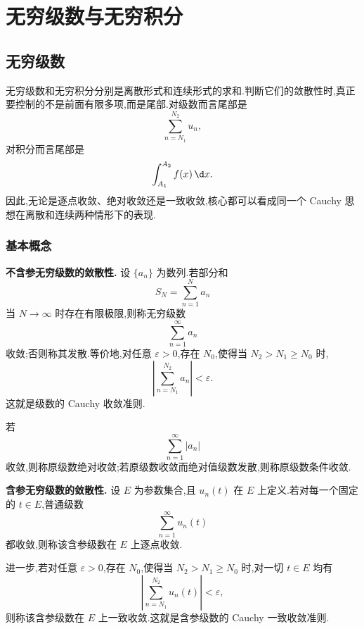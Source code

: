 \section{无穷级数与无穷积分}


\subsection{无穷级数}

无穷级数和无穷积分分别是离散形式和连续形式的求和.判断它们的敛散性时,真正要控制的不是前面有限多项,而是尾部.对级数而言尾部是
\begin{equation*}
	\sum_{n=N_1}^{N_2}u_n,
\end{equation*}
对积分而言尾部是
\begin{equation*}
	\int_{A_1}^{A_2}f(x)\,\d x.
\end{equation*}
因此,无论是逐点收敛、绝对收敛还是一致收敛,核心都可以看成同一个 Cauchy 思想在离散和连续两种情形下的表现.

\subsubsection{基本概念}

\textbf{不含参无穷级数的敛散性.}
设 $\{a_n\}$ 为数列.若部分和
\begin{equation*}
	S_N=\sum_{n=1}^N a_n
\end{equation*}
当 $N\to\infty$ 时存在有限极限,则称无穷级数
\begin{equation*}
	\sum_{n=1}^{\infty}a_n
\end{equation*}
收敛;否则称其发散.等价地,对任意 $\varepsilon>0$,存在 $N_0$,使得当 $N_2>N_1\geq N_0$ 时,
\begin{equation*}
	\left|\sum_{n=N_1}^{N_2}a_n\right|<\varepsilon.
\end{equation*}
这就是级数的 Cauchy 收敛准则.

若
\begin{equation*}
	\sum_{n=1}^{\infty}|a_n|
\end{equation*}
收敛,则称原级数绝对收敛;若原级数收敛而绝对值级数发散,则称原级数条件收敛.

\textbf{含参无穷级数的敛散性.}
设 $E$ 为参数集合,且 $u_n(t)$ 在 $E$ 上定义.若对每一个固定的 $t\in E$,普通级数
\begin{equation*}
	\sum_{n=1}^{\infty}u_n(t)
\end{equation*}
都收敛,则称该含参级数在 $E$ 上逐点收敛.

进一步,若对任意 $\varepsilon>0$,存在 $N_0$,使得当 $N_2>N_1\geq N_0$ 时,对一切 $t\in E$ 均有
\begin{equation*}
	\left|\sum_{n=N_1}^{N_2}u_n(t)\right|<\varepsilon,
\end{equation*}
则称该含参级数在 $E$ 上一致收敛.这就是含参级数的 Cauchy 一致收敛准则.

